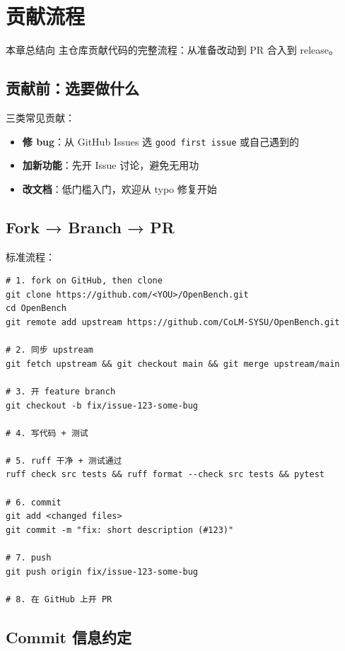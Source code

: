 
\chapter{贡献流程}

本章总结向 \openbench{} 主仓库贡献代码的完整流程：从准备改动到 PR 合入到 release。

\section{贡献前：选要做什么}

三类常见贡献：

\begin{itemize}
  \item \textbf{修 bug}：从 GitHub Issues 选 \texttt{good first issue} 或自己遇到的
  \item \textbf{加新功能}：先开 Issue 讨论，避免无用功
  \item \textbf{改文档}：低门槛入门，欢迎从 typo 修复开始
\end{itemize}

\section{Fork → Branch → PR}

标准流程：

\begin{verbatim}
# 1. fork on GitHub, then clone
git clone https://github.com/<YOU>/OpenBench.git
cd OpenBench
git remote add upstream https://github.com/CoLM-SYSU/OpenBench.git

# 2. 同步 upstream
git fetch upstream && git checkout main && git merge upstream/main

# 3. 开 feature branch
git checkout -b fix/issue-123-some-bug

# 4. 写代码 + 测试

# 5. ruff 干净 + 测试通过
ruff check src tests && ruff format --check src tests && pytest

# 6. commit
git add <changed files>
git commit -m "fix: short description (#123)"

# 7. push
git push origin fix/issue-123-some-bug

# 8. 在 GitHub 上开 PR
\end{verbatim}

\section{Commit 信息约定}

